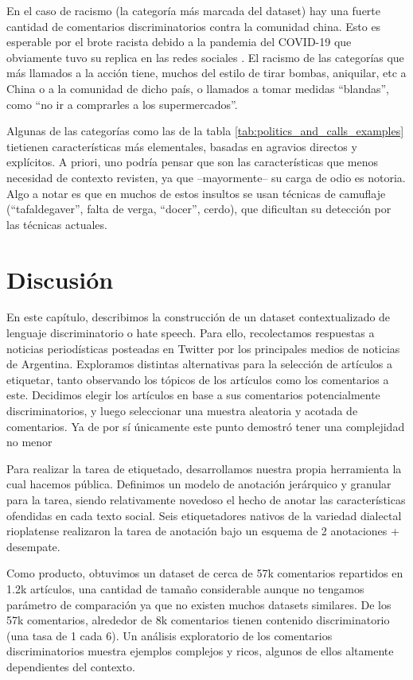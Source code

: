 En el caso de racismo (la categoría más marcada del dataset) hay una fuerte cantidad de comentarios discriminatorios contra la comunidad china. Esto es esperable por el brote racista debido a la pandemia del COVID-19 que obviamente tuvo su replica en las redes sociales \cite{he2021racism}. El racismo de las categorías que más llamados a la acción tiene, muchos del estilo de tirar bombas, aniquilar, etc a China o a la comunidad de dicho país, o llamados a tomar medidas ``blandas'', como ``no ir a comprarles a los supermercados''.

Algunas de las categorías como las de la tabla \ref{tab:politics_and_calls_examples} tietienen características más elementales, basadas en agravios directos y explícitos. A priori, uno podría pensar que son las características que menos necesidad de contexto revisten, ya que --mayormente-- su carga de odio es notoria. Algo a notar es que en muchos de estos insultos se usan técnicas de camuflaje (``tafaldegaver'', falta de verga, ``docer'', cerdo), que dificultan su detección por las técnicas actuales.




\section{Discusión}

En este capítulo, describimos la construcción de un dataset contextualizado de lenguaje discriminatorio o hate speech. Para ello, recolectamos respuestas a noticias periodísticas posteadas en Twitter por los principales medios de noticias de Argentina. Exploramos distintas alternativas para la selección de artículos a etiquetar, tanto observando los tópicos de los artículos como los comentarios a este. Decidimos elegir los artículos en base a sus comentarios potencialmente discriminatorios, y luego seleccionar una muestra aleatoria y acotada de comentarios. Ya de por sí únicamente este punto demostró tener una complejidad no menor


Para realizar la tarea de etiquetado, desarrollamos nuestra propia herramienta la cual hacemos pública. Definimos un modelo de anotación jerárquico y granular para la tarea, siendo relativamente novedoso el hecho de anotar las características ofendidas en cada texto social. Seis etiquetadores nativos de la variedad dialectal rioplatense realizaron la tarea de anotación bajo un esquema de 2 anotaciones + desempate.

Como producto, obtuvimos un dataset de cerca de 57k comentarios repartidos en 1.2k artículos, una cantidad de tamaño considerable aunque no tengamos parámetro de comparación ya que no existen muchos datasets similares. De los 57k comentarios, alrededor de 8k comentarios tienen contenido discriminatorio (una tasa de 1 cada 6). Un análisis exploratorio de los comentarios discriminatorios muestra ejemplos complejos y ricos, algunos de ellos altamente dependientes del contexto.

